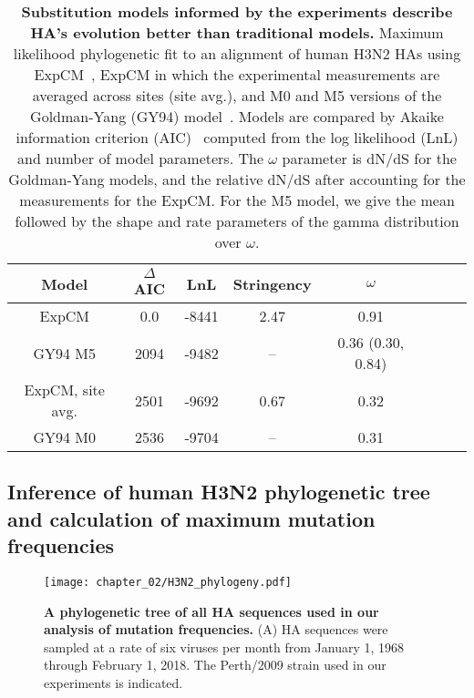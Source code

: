 \begin{table}
\caption[{Substitution models informed by the experiments describe HA's evolution better than traditional models.}]{\label{tab:phydms}
  {\bf Substitution models informed by the experiments describe HA's evolution better than traditional models.}
  Maximum likelihood phylogenetic fit to an alignment of human H3N2 HAs using ExpCM~\citep{hilton2017phydms}, ExpCM in which the experimental measurements are averaged across sites (site avg.), and M0 and M5 versions of the Goldman-Yang (GY94) model~\citep{yang2000codon}.
  Models are compared by Akaike information criterion (AIC)~\citep{posada2004model} computed from the log likelihood (LnL) and number of model parameters.
  The $\omega$ parameter is dN/dS for the Goldman-Yang models, and the relative dN/dS after accounting for the measurements for the ExpCM.
  For the M5 model, we give the mean followed by the shape and rate parameters of the gamma distribution over $\omega$.
}
\begin{center}
\begin{tabular}{cccccccc}
\hline
\bf{Model} & \bf{$\Delta$AIC} & \bf{LnL} & \bf{Stringency} & \bf{$\omega$}  \\ \hline
ExpCM & 0.0 & -8441 & 2.47 & 0.91 \\
GY94 M5 & 2094 & -9482 & -- & 0.36 (0.30, 0.84) \\
ExpCM, site avg. & 2501 & -9692 & 0.67 & 0.32 \\
GY94 M0 & 2536 & -9704 & -- & 0.31 \\
\hline
\end{tabular}
 \end{center}
\end{table}

\subsection*{Inference of human H3N2 phylogenetic tree and calculation of maximum mutation frequencies}

\begin{figure}
\centerline{\texttt{[image: chapter\_02/H3N2\_phylogeny.pdf]}}
\caption[{A phylogenetic tree of all HA sequences used in our analysis of mutation frequencies.}]{\label{suppfig:tree}
  {\bf A phylogenetic tree of all HA sequences used in our analysis of mutation frequencies.}
  (A) HA sequences were sampled at a rate of six viruses per month from January 1, 1968 through February 1, 2018.
  The Perth/2009 strain used in our experiments is indicated.
}
\end{figure}

